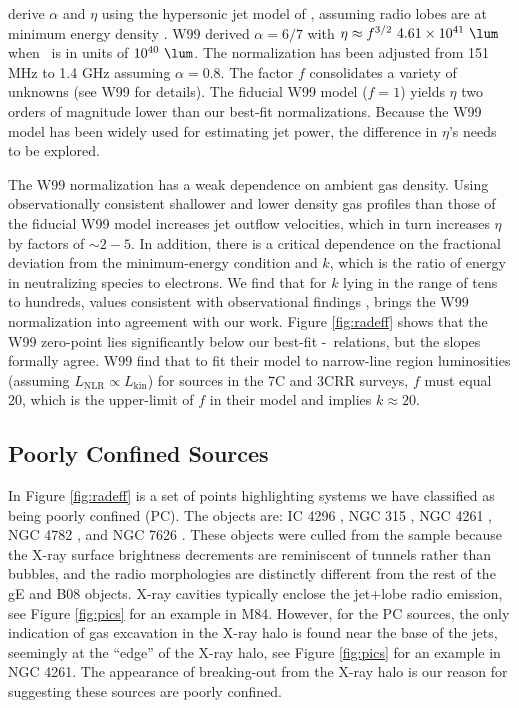 \documentclass{emulateapj}
\begin{document}
\citet[][hereafter W99]{1999MNRAS.309.1017W} derive $\alpha$ and
$\eta$ using the hypersonic jet model of \citet{1991MNRAS.250..581F},
assuming radio lobes are at minimum energy density \citep[see][for
details]{1980ARA&A..18..165M}. W99 derived $\alpha = 6/7$ with $\eta
\approx f^{3/2}~4.61\times10^{41} ~\lum$ when \prad\ is in units of
$10^{40} ~\lum$. The normalization has been adjusted from 151 MHz to
1.4 GHz assuming $\alpha = 0.8$. The factor $f$ consolidates a variety
of unknowns (see W99 for details). The fiducial W99 model ($f=1$)
yields $\eta$ two orders of magnitude lower than our best-fit
normalizations. Because the W99 model has been widely used for
estimating jet power, the difference in $\eta$'s needs to be explored.

The W99 normalization has a weak dependence on ambient gas density.
Using observationally consistent shallower and lower density gas
profiles than those of the fiducial W99 model increases jet outflow
velocities, which in turn increases $\eta$ by factors of $\sim
2-5$. In addition, there is a critical dependence on the fractional
deviation from the minimum-energy condition and $k$, which is the
ratio of energy in neutralizing species to electrons. We find that for
$k$ lying in the range of tens to hundreds, values consistent with
observational findings \citep{2005MNRAS.364.1343D,
2006MNRAS.372.1741D, 2006ApJ...648..200D, birzan08}, brings the W99
normalization into agreement with our work. Figure \ref{fig:radeff}
shows that the W99 zero-point lies significantly below our best-fit
\pjet-\prad\ relations, but the slopes formally agree. W99 find that
to fit their model to narrow-line region luminosities (assuming
$L_{\mathrm{NLR}} \propto L_{\mathrm{kin}}$) for sources in the 7C and
3CRR surveys, $f$ must equal 20, which is the upper-limit of $f$ in
their model and implies $k \approx 20$.

\subsection{Poorly Confined Sources}
\label{sec:jet}

In Figure \ref{fig:radeff} is a set of points highlighting systems we
have classified as being poorly confined (PC). The objects are: IC
4296 \citep{1988ApJ...324..198K, 2003ApJ...585..677P}, NGC 315
\citep{1979ApJ...228L...9B, 1981A&A....95..250W}, NGC 4261
\citep{1997ApJ...484..186J, 2000ApJ...534..165J}, NGC 4782
\citep{2007ApJ...664..804M}, and NGC 7626 \citep{1985ApJ...291...32B}.
These objects were culled from the sample because the X-ray surface
brightness decrements are reminiscent of tunnels rather than bubbles,
and the radio morphologies are distinctly different from the rest of
the gE and B08 objects. X-ray cavities typically enclose the jet+lobe
radio emission, see Figure \ref{fig:pics} for an example in
M84. However, for the PC sources, the only indication of gas
excavation in the X-ray halo is found near the base of the jets,
seemingly at the ``edge'' of the X-ray halo, see Figure \ref{fig:pics}
for an example in NGC 4261. The appearance of breaking-out from the
X-ray halo is our reason for suggesting these sources are poorly
confined.
\end{document}
